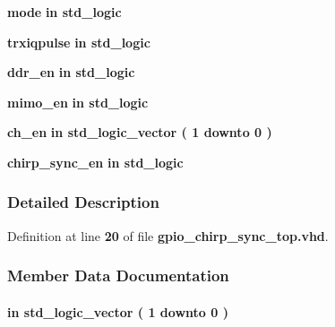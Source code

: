 \begin{DoxyCompactItemize}
\item 
{\bf mode}  {\bfseries {\bfseries \textcolor{keywordflow}{in}\textcolor{vhdlchar}{ }}} {\bfseries \textcolor{comment}{std\+\_\+logic}\textcolor{vhdlchar}{ }} 
\item 
{\bf trxiqpulse}  {\bfseries {\bfseries \textcolor{keywordflow}{in}\textcolor{vhdlchar}{ }}} {\bfseries \textcolor{comment}{std\+\_\+logic}\textcolor{vhdlchar}{ }} 
\item 
{\bf ddr\+\_\+en}  {\bfseries {\bfseries \textcolor{keywordflow}{in}\textcolor{vhdlchar}{ }}} {\bfseries \textcolor{comment}{std\+\_\+logic}\textcolor{vhdlchar}{ }} 
\item 
{\bf mimo\+\_\+en}  {\bfseries {\bfseries \textcolor{keywordflow}{in}\textcolor{vhdlchar}{ }}} {\bfseries \textcolor{comment}{std\+\_\+logic}\textcolor{vhdlchar}{ }} 
\item 
{\bf ch\+\_\+en}  {\bfseries {\bfseries \textcolor{keywordflow}{in}\textcolor{vhdlchar}{ }}} {\bfseries \textcolor{comment}{std\+\_\+logic\+\_\+vector}\textcolor{vhdlchar}{ }\textcolor{vhdlchar}{(}\textcolor{vhdlchar}{ }\textcolor{vhdlchar}{ } \textcolor{vhdldigit}{1} \textcolor{vhdlchar}{ }\textcolor{keywordflow}{downto}\textcolor{vhdlchar}{ }\textcolor{vhdlchar}{ } \textcolor{vhdldigit}{0} \textcolor{vhdlchar}{ }\textcolor{vhdlchar}{)}\textcolor{vhdlchar}{ }} 
\item 
{\bf chirp\+\_\+sync\+\_\+en}  {\bfseries {\bfseries \textcolor{keywordflow}{in}\textcolor{vhdlchar}{ }}} {\bfseries \textcolor{comment}{std\+\_\+logic}\textcolor{vhdlchar}{ }} 
\end{DoxyCompactItemize}


\subsubsection{Detailed Description}


Definition at line {\bf 20} of file {\bf gpio\+\_\+chirp\+\_\+sync\+\_\+top.\+vhd}.



\subsubsection{Member Data Documentation}
\paragraph[{ch\+\_\+en}]{ {\bfseries \textcolor{keywordflow}{in}\textcolor{vhdlchar}{ }} {\bfseries \textcolor{comment}{std\+\_\+logic\+\_\+vector}\textcolor{vhdlchar}{ }\textcolor{vhdlchar}{(}\textcolor{vhdlchar}{ }\textcolor{vhdlchar}{ } \textcolor{vhdldigit}{1} \textcolor{vhdlchar}{ }\textcolor{keywordflow}{downto}\textcolor{vhdlchar}{ }\textcolor{vhdlchar}{ } \textcolor{vhdldigit}{0} \textcolor{vhdlchar}{ }\textcolor{vhdlchar}{)}\textcolor{vhdlchar}{ }} \hspace{0.3cm}{\ttfamily [Port]}}\label{classgpio__chirp__sync__top_a6494f316f504075c4ccf47146756d576}


